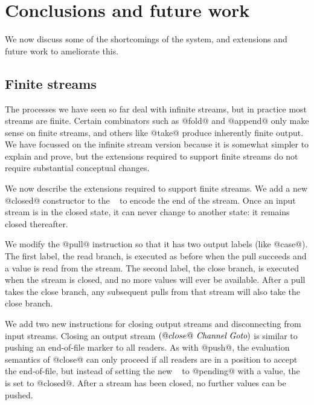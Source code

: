 \section{Conclusions and future work}
\label{s:FutureWork}

We now discuss some of the shortcomings of the system, and extensions and future work to ameliorate this.

\subsection{Finite streams}
\label{s:Finite}

The processes we have seen so far deal with infinite streams, but in practice most streams are finite.
Certain combinators such as @fold@ and @append@ only make sense on finite streams, and others like @take@ produce inherently finite output.
We have focussed on the infinite stream version because it is somewhat simpler to explain and prove, but the extensions required to support finite streams do not require substantial conceptual changes.

We now describe the extensions required to support finite streams.
We add a new @closed@ constructor to the \InputState~ to encode the end of the stream.
Once an input stream is in the closed state, it can never change to another state: it remains closed thereafter.

We modify the @pull@ instruction so that it has two output labels (like @case@).
The first label, the read branch, is executed as before when the pull succeeds and a value is read from the stream.
The second label, the close branch, is executed when the stream is closed, and no more values will ever be available.
After a pull takes the close branch, any subsequent pulls from that stream will also take the close branch.

We add two new instructions for closing output streams and disconnecting from input streams.
Closing an output stream $(@close@~\textit{Channel}~\textit{Goto})$ is similar to pushing an end-of-file marker to all readers.
As with @push@, the evaluation semantics of @close@ can only proceed if all readers are in a position to accept the end-of-file, but instead of setting the new \InputState~ to @pending@ with a value, the \InputState~ is set to @closed@.
After a stream has been closed, no further values can be pushed.

